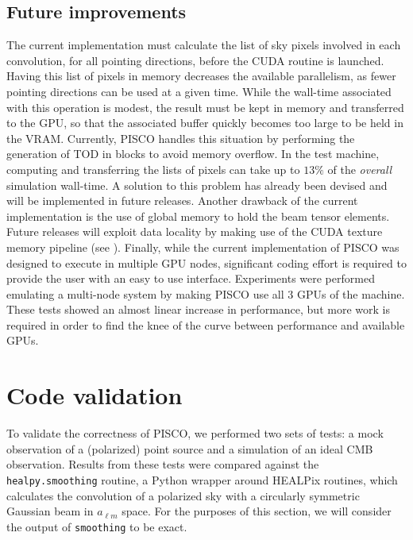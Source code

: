 \documentclass[a4paper,11pt]{article}
\begin{document}
\subsection{Future improvements}

The current implementation must calculate the list of sky pixels involved in each convolution, for all pointing directions, before the CUDA routine is launched. Having this list of pixels in memory decreases the available parallelism, as fewer pointing directions can be used at a given time. While the wall-time associated with this operation is modest, the result must be kept in memory and transferred to the GPU, so that the associated buffer quickly becomes too large to be held in the VRAM. Currently, PISCO handles this situation by performing the generation of TOD in blocks to avoid memory overflow. In the test machine, computing and transferring the lists of pixels can take up to $13\%$ of the \textsl{overall} simulation wall-time. A solution to this problem has already been devised and will be implemented in future releases. Another drawback of the current implementation is the use of global memory to hold the beam tensor elements. Future releases will exploit data locality by making use of the CUDA texture memory pipeline (see \cite{sanders2010cuda}). Finally, while the current implementation of PISCO was designed to execute in multiple GPU nodes, significant coding effort is required to provide the user with an easy to use interface. Experiments were performed emulating a multi-node system by making PISCO use all 3 GPUs of the machine. These tests showed an almost linear increase in performance, but more work is required in order to find the knee of the curve between performance and available GPUs.

\section{Code validation}
\label{sec::validation}

To validate the correctness of PISCO, we performed two sets of tests: a mock observation of a (polarized) point source and a simulation of an ideal CMB observation. Results from these tests were compared against the \texttt{healpy.smoothing} routine, a Python wrapper around HEALPix routines, which calculates the convolution of a polarized sky with a circularly symmetric Gaussian beam in $a_{\ell m}$ space. For the purposes of this section, we will consider the output of \texttt{smoothing} to be exact. 
\end{document}
